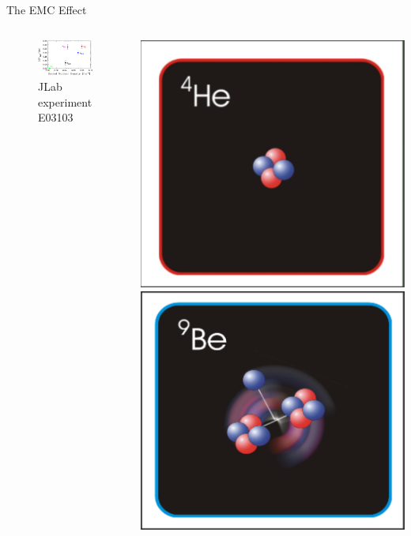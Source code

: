 \documentclass[12pt,usenames,dvipsnames]{beamer}
\begin{document}
\begin{frame}{The EMC Effect}
\begin{columns}
	\vspace{-35pt}
	\begin{figure}
		\caption*{JLab experiment E03103 \cite{E3103} }
		\includegraphics[width =8cm]{../images/Thesis/EMC_rho.pdf}
	\end{figure}
\pause

	{\centering
	{\vspace{-20pt}	\includegraphics[width=4.cm]{../images/He4.png}}
	{\vspace{5pt}	\includegraphics[width=4.cm]{../images/Be9.png}}
	}

\end{columns}
\end{frame}
\end{document}
